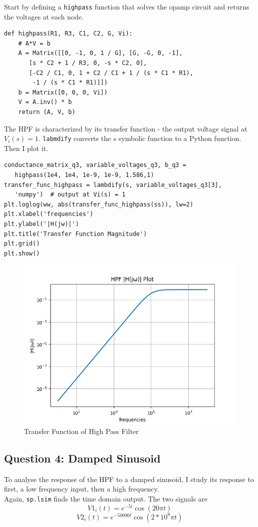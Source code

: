 \documentclass[11pt, a4paper]{article}
\begin{document}
Start by defining a \texttt{highpass} function that solves the opamp circuit and returns the voltages at each node. 

\begin{verbatim}
def highpass(R1, R3, C1, C2, G, Vi):
    # A*V = b
    A = Matrix([[0, -1, 0, 1 / G], [G, -G, 0, -1], 
       [s * C2 + 1 / R3, 0, -s * C2, 0], 
       [-C2 / C1, 0, 1 + C2 / C1 + 1 / (s * C1 * R1),
        -1 / (s * C1 * R1)]])
    b = Matrix([0, 0, 0, Vi])
    V = A.inv() * b
    return (A, V, b)
\end{verbatim}

The HPF is characterized by its transfer function - the output voltage signal at $V_i(s)=1$. \texttt{labmdify} converts the $s$ symbolic function to a Python function. Then I plot it. 

\begin{verbatim}
conductance_matrix_q3, variable_voltages_q3, b_q3 = 
   highpass(1e4, 1e4, 1e-9, 1e-9, 1.586,1)
transfer_func_highpass = lambdify(s, variable_voltages_q3[3],
   'numpy')  # output at Vi(s) = 1
plt.loglog(ww, abs(transfer_func_highpass(ss)), lw=2)
plt.xlabel('frequencies')
plt.ylabel('|H(jw)|')
plt.title('Transfer Function Magnitude')
plt.grid()
plt.show()
\end{verbatim}  

  \begin{figure}[!tbh]
   	\centering
  \includegraphics[scale=0.5]{q3.png} 
    \caption{Transfer Function of High Pass Filter} 	
   \end{figure} 


\subsection{Question 4: Damped Sinusoid}
To analyse the response of the HPF to a damped sinusoid, I study its response to first, a low frequency input, then a high frequency. \\
Again, \texttt{sp.lsim} finds the time domain output. The two signals are $$V1_i(t)=e^{-5t}\cos(20\pi t)$$
$$V2_i(t)=e^{-50000t}\cos(2*10^8\pi t)$$
\end{document}
